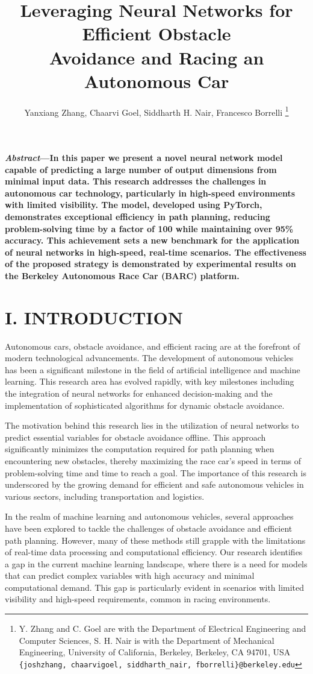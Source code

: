 \documentclass[
	letterpaper, %
	10pt, %
	unnumberedsections, %
	twoside, %
]{LTJournalArticle}
\title{Leveraging Neural Networks for Efficient Obstacle\\Avoidance and Racing an Autonomous Car} %
\author{Yanxiang Zhang, Chaarvi Goel, Siddharth H. Nair, Francesco Borrelli
\thanks{\;Y. Zhang and C. Goel are with the Department of Electrical Engineering and Computer Sciences, S. H. Nair is with the Department of Mechanical Engineering, University of California, Berkeley, Berkeley, CA 94701, USA \texttt{\{joshzhang, chaarvigoel, siddharth\_nair, fborrelli\}@berkeley.edu}}
}
\date{}    %
\begin{document}
\maketitle %


\textbf{\small\textit{Abstract}---In this paper we present a novel neural network model capable of predicting a large number of output dimensions from minimal input data. This research addresses the challenges in autonomous car technology, particularly in high-speed environments with limited visibility. The model, developed using PyTorch, demonstrates exceptional efficiency in path planning, reducing problem-solving time by a factor of 100 while maintaining over 95\% accuracy. This achievement sets a new benchmark for the application of neural networks in high-speed, real-time scenarios. The effectiveness of the proposed strategy is demonstrated by experimental results on the Berkeley Autonomous Race Car (BARC) platform.}

\section{I. INTRODUCTION}

Autonomous cars, obstacle avoidance, and efficient racing are at the forefront of modern technological advancements. The development of autonomous vehicles has been a significant milestone in the field of artificial intelligence and machine learning. This research area has evolved rapidly, with key milestones including the integration of neural networks for enhanced decision-making and the implementation of sophisticated algorithms for dynamic obstacle avoidance.

The motivation behind this research lies in the utilization of neural networks to predict essential variables for obstacle avoidance offline. This approach significantly minimizes the computation required for path planning when encountering new obstacles, thereby maximizing the race car's speed in terms of problem-solving time and time to reach a goal. The importance of this research is underscored by the growing demand for efficient and safe autonomous vehicles in various sectors, including transportation and logistics.

In the realm of machine learning and autonomous vehicles, several approaches have been explored to tackle the challenges of obstacle avoidance and efficient path planning. However, many of these methods still grapple with the limitations of real-time data processing and computational efficiency. Our research identifies a gap in the current machine learning landscape, where there is a need for models that can predict complex variables with high accuracy and minimal computational demand. This gap is particularly evident in scenarios with limited visibility and high-speed requirements, common in racing environments.
\end{document}
